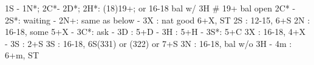 1S - 1N*; 2C*- 2D*; 
2H*: (18)19+; or 16-18 bal w/ 3H  # 19+ bal open 2C*
   - 2S*: waiting
           - 2N+: same as below
   - 3X : nat good 6+X, ST
2S : 12-15, 6+S
2N : 16-18, some 5+X
   - 3C*: ask
        - 3D : 5+D
        - 3H : 5+H
        - 3S*: 5+C
3X : 16-18, 4+X
   - 3S : 2+S
3S : 16-18, 6S(331) or (322) or 7+S
3N : 16-18, bal w/o 3H
   - 4m : 6+m, ST